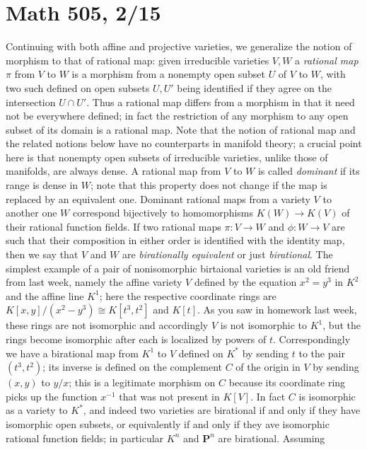 \documentclass[10pt]{article}
\begin{document}
\section*{Math 505, 2/15}

Continuing with both affine and projective varieties, we generalize the
notion of morphism to that of rational map: given irreducible varieties
$V,W$ a {\sl rational map} $\pi$ from $V$ to $W$ is a morphism from a
nonempty open subset $U$ of $V$ to $W$, with two such defined on open
subsets $U,U'$ being identified if they agree on the intersection $U\cap
U'$. Thus a rational map differs from a morphism in that it need not be
everywhere defined; in fact the restriction of any morphism to any open
subset of its domain is a rational map. Note that the notion of rational
map and the related notions below have no counterparts in manifold
theory; a crucial point here is that nonempty open subsets of
irreducible varieties, unlike those of manifolds, are always dense. A
rational map from $V$ to $W$ is called {\sl dominant} if its range is
dense in $W$; note that this property does not change if the map is
replaced by an equivalent one. Dominant rational maps from a variety $V$
to another one $W$ correspond bijectively to homomorphisms
$K(W)\rightarrow K(V)$ of their rational function fields. If two
rational maps $\pi:V\rightarrow W$ and $\phi:W\rightarrow V$ are such
that their composition in either order is identified with the identity
map, then we say that $V$ and $W$ are {\sl birationally equivalent} or
just {\sl birational}. The simplest example of a pair of nonisomorphic
birtaional varieties is an old friend from last week, namely the affine
variety $V$ defined by the equation $x^2 = y^3$ in $K^2$ and the affine
line $K^1$; here the respective coordinate rings are $K[x,y]/(x^2 -
y^3)\cong K[t^3,t^2]$ and $K[t]$. As you saw in homework last week,
these rings are not isomorphic and accordingly $V$ is not isomorphic to
$K^1$, but the rings become isomorphic after each is localized by powers
of $t$. Correspondingly we have a birational map from $K^1$ to $V$
defined on $K^*$ by sending $t$ to the pair $(t^3,t^2)$; its inverse is
defined on the complement $C$ of the origin in $V$ by sending $(x,y)$ to
$y/x$; this is a legitimate morphism on $C$ because its coordinate ring
picks up the function $x^{-1}$ that was not present in $K[V]$. In fact
$C$ is isomorphic as a variety to $K^*$, and indeed two varieties are
birational if and only if they have isomorphic open subsets, or
equivalently if and only if they ave isomorphic rational function
fields; in particular $K^n$ and $\mathbf P^n$ are birational. Assuming
\end{document}
